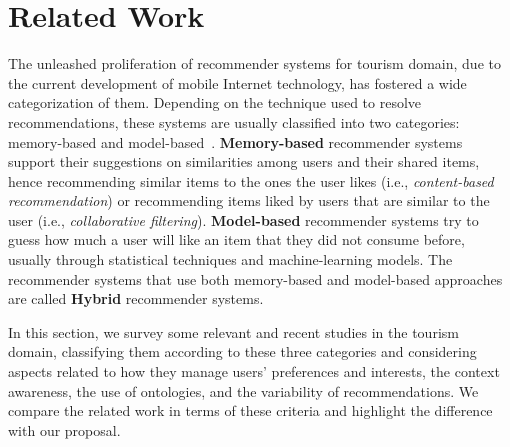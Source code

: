 \section{Related Work} \label{section:related-work}




The unleashed proliferation  of recommender systems for tourism domain, due to the current development of mobile Internet technology, has fostered a wide categorization of them. 
Depending on the technique used to resolve recommendations, these systems are usually classified into two categories: memory-based and model-based~\cite{bobadilla2013recommender,ebrahim_2012}. \textbf{Memory-based} recommender systems support their  suggestions on similarities among users and their shared items, hence recommending similar items to the ones the user likes (i.e., \textit{content-based recommendation}) or recommending items liked by users that are similar to the user (i.e., \textit{collaborative filtering}). \textbf{Model-based} recommender systems try to guess how much a user will like an item that they did not consume before, usually through statistical techniques and machine-learning models. The recommender systems that use both memory-based and model-based approaches are called \textbf{Hybrid} recommender systems.

In this section, we survey some relevant and recent studies in the tourism domain, classifying them according to these three categories and considering aspects related to  how they manage users' preferences and interests, the context awareness, the use of ontologies, and the variability of recommendations. We compare the related work in terms of these criteria and highlight the difference with our proposal.    

